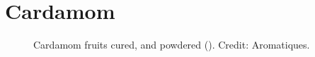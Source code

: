 


\section{Cardamom}
\label{sec:cardamom}\label{sec:black_cardamom}



\begin{figure}[!ht]
	\vspace{-2ex}
	\centering
	\hfill
	\hfill
	\caption[True cardamoms]{Cardamom fruits cured, and powdered (). Credit: Aromatiques.}
	\label{fig:cardamom_imgs}
\end{figure}


